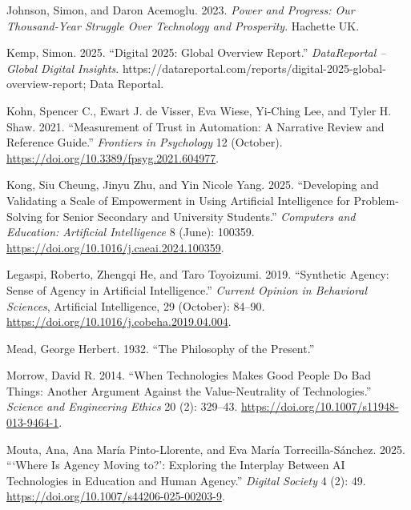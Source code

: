 \documentclass[
  letterpaper,
  DIV=11,
  numbers=noendperiod]{scrartcl}
\newlength{\cslhangindent}
\newenvironment{CSLReferences}[2] %
 {\begin{list}{}{%
  \setlength{\itemindent}{0pt}
  \setlength{\leftmargin}{0pt}
  \setlength{\parsep}{0pt}
  \ifodd #1
   \setlength{\leftmargin}{\cslhangindent}
   \setlength{\itemindent}{-1\cslhangindent}
  \fi
  \setlength{\itemsep}{#2\baselineskip}}}
 {\end{list}}
\begin{document}
\begin{CSLReferences}{1}{0}
Johnson, Simon, and Daron Acemoglu. 2023. \emph{Power and {Progress}:
{Our Thousand-Year Struggle Over Technology} and {Prosperity}}. Hachette
UK.

Kemp, Simon. 2025. {``Digital 2025: {Global Overview Report}.''}
\emph{DataReportal -- Global Digital Insights}.
https://datareportal.com/reports/digital-2025-global-overview-report;
Data Reportal.

Kohn, Spencer C., Ewart J. de Visser, Eva Wiese, Yi-Ching Lee, and Tyler
H. Shaw. 2021. {``Measurement of {Trust} in {Automation}: {A Narrative
Review} and {Reference Guide}.''} \emph{Frontiers in Psychology} 12
(October). \url{https://doi.org/10.3389/fpsyg.2021.604977}.

Kong, Siu Cheung, Jinyu Zhu, and Yin Nicole Yang. 2025. {``Developing
and Validating a Scale of Empowerment in Using Artificial Intelligence
for Problem-Solving for Senior Secondary and University Students.''}
\emph{Computers and Education: Artificial Intelligence} 8 (June):
100359. \url{https://doi.org/10.1016/j.caeai.2024.100359}.

Legaspi, Roberto, Zhengqi He, and Taro Toyoizumi. 2019. {``Synthetic
Agency: Sense of Agency in Artificial Intelligence.''} \emph{Current
Opinion in Behavioral Sciences}, Artificial {Intelligence}, 29
(October): 84--90. \url{https://doi.org/10.1016/j.cobeha.2019.04.004}.

Mead, George Herbert. 1932. {``The Philosophy of the Present.''}

Morrow, David R. 2014. {``When {Technologies Makes Good People Do Bad
Things}: {Another Argument Against} the {Value-Neutrality} of
{Technologies}.''} \emph{Science and Engineering Ethics} 20 (2):
329--43. \url{https://doi.org/10.1007/s11948-013-9464-1}.

Mouta, Ana, Ana María Pinto-Llorente, and Eva María Torrecilla-Sánchez.
2025. {``{`{Where} Is {Agency Moving} to?'}: {Exploring} the {Interplay}
Between {AI Technologies} in {Education} and {Human Agency}.''}
\emph{Digital Society} 4 (2): 49.
\url{https://doi.org/10.1007/s44206-025-00203-9}.


\end{CSLReferences}
\end{document}
